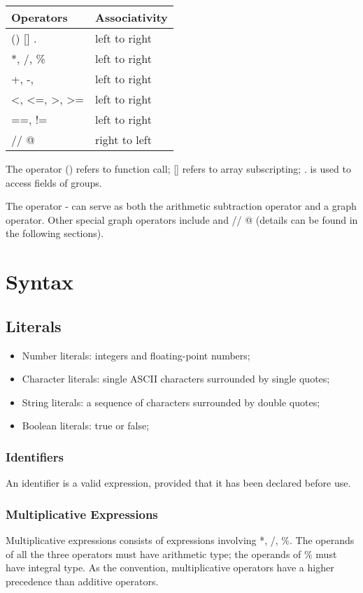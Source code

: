 \documentclass[11pt,letterpaper]{article}
\begin{document}
\begin{center}
    \begin{tabular}{| p{4cm} | p{4cm} |}		\hline
    Operators 		& Associativity \\ 		\hline \hline
    () [] . 			& left to right \\ 		\hline
    *, /, \% 		& left to right \\ 		\hline
    +, -, \textbar	& left to right \\ 		\hline
    \textless,  \textless=,  \textgreater,  \textgreater=	& left to right \\ 		\hline
    ==,  !=			& left to right \\ 		\hline
    // @				& right to left\\ 		\hline
    
    \end{tabular}
\end{center}

The operator () refers to function call; [] refers to array subscripting; . is used to access fields of groups. 

The operator - can serve as both the arithmetic subtraction operator and a graph operator.  Other special graph operators include \textbar and // @ (details can be found in the following sections).

\section {Syntax}
\subsection {Literals}
\begin{itemize}
\item Number literals: integers and floating-point numbers;
\item Character literals: single ASCII characters surrounded by single quotes;
\item String literals: a sequence of characters surrounded by double quotes;
\item Boolean literals: true or false;
\end{itemize}
\subsubsection {Identifiers}
An identifier is a valid expression, provided that it has been declared before use.

\subsubsection {Multiplicative Expressions}
Multiplicative expressions consists of expressions involving *, /, \%. The operands of all the three operators must have arithmetic type; the operands of \% must have integral type. As the convention, multiplicative operators have a higher precedence than additive operators. 
\end{document}

